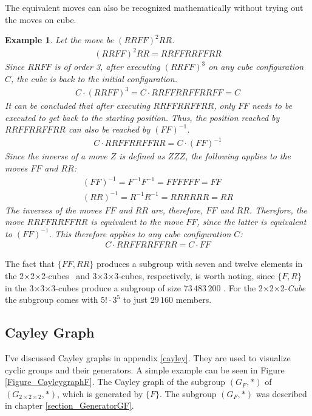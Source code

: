 \documentclass[12pt,a4paper]{article}
\theoremstyle{custom}
\newtheorem*{example}{Example}
\newcommand{\Gtwo}{\ensuremath{G_{2\times 2\times 2}}}
\newcommand{\Ttwo}{2$\times$2$\times$2-}
\newcommand{\Tthree}{3$\times$3$\times$3-}
\begin{document}
The equivalent moves can also be recognized mathematically without trying out the moves on cube.
\begin{example}
Let the move be $(RRFF)^2 RR$. 
\begin{align*}
(RRFF)^2 RR = RRFFRRFFRR
\end{align*}
Since $RRFF$ is of order 3, after executing $(RRFF)^3$ on any cube configuration $C$, the cube is back to the initial configuration.
\begin{align*}
C \cdot (RRFF)^3 = C \cdot RRFFRRFFRRFF = C
\end{align*}
It can be concluded that after executing $RRFFRRFFRR$, only $FF$ needs to be executed to get back to the starting position. Thus, the position reached by $RRFFRRFFRR$ can also be reached by $(FF)^{-1}$.
\begin{align*}
C \cdot RRFFRRFFRR = C \cdot (FF)^{-1}
\end{align*}
Since the inverse of a move $Z$ is defined as $ZZZ$, the following applies to the moves $FF$ and $RR$:
\begin{align*}
(FF)^{-1} = F^{-1}F^{-1} = FFFFFF = FF \\
(RR)^{-1} = R^{-1}R^{-1} = RRRRRR = RR
\end{align*}
The inverses of the moves $FF$ and $RR$ are, therefore, $FF$ and $RR$. Therefore, the move $RRFFRRFFRR$ is equivalent to the move $FF$, since the latter is equivalent to $(FF)^{-1}$. This therefore applies to any cube configuration $C$:
\begin{align*}
C \cdot RRFFRRFFRR = C \cdot FF
\end{align*}
\end{example}

The fact that $\{ FF, RR \}$ produces a subgroup with seven and twelve elements in the \Ttwo cubes \ and \Tthree cubes, respectively, is worth noting, since $\{ F, R \}$ in the \Tthree cubes produce a subgroup of size $73\, 483\, 200$ \cite{TD}.
For the \Ttwo \textit{Cube} the subgroup comes with $5! \cdot 3^5$ to just $29 \, 160$ members.

\subsection{Cayley Graph}

I've discussed Cayley graphs in appendix \ref{cayley}. They are used to visualize cyclic groups and their generators.
A simple example can be seen in Figure \ref{Figure_CayleygraphF}. The Cayley graph of the subgroup $\left(G_F, \scriptstyle*\right)$ of $\left(\Gtwo, \scriptstyle*\right)$, which is generated by $\{ F \}$. The subgroup $\left(G_F, \scriptstyle*\right)$ was described in chapter \ref{section_GeneratorGF}.
\end{document}

